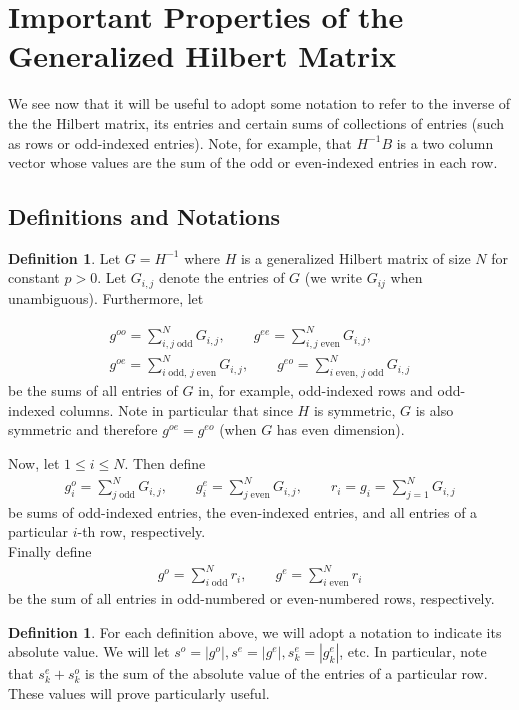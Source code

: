\documentclass{article}
\theoremstyle{definition}
\newtheorem{defn}[thm]{Definition}
\theoremstyle{remark}
\numberwithin{equation}{section}
\begin{document}
\section{Important Properties of the Generalized Hilbert Matrix}
\label{hilbert-matrices}
We see now that it will be useful to adopt some notation to refer to the inverse of the the Hilbert matrix, its entries and certain sums of collections of entries (such as rows or odd-indexed entries). Note, for example, that $H^{-1}B$ is a two column vector whose values are the sum of the odd or even-indexed entries in each row. 
\subsection{Definitions and Notations}
\begin{defn}
Let $G=H^{-1}$ where $H$ is a generalized Hilbert matrix of size $N$ for constant $p > 0$. Let $G_{i,j}$ denote the entries of $G$ (we write $G_{ij}$ when unambiguous). Furthermore, let 

\begin{align*} 
g^{oo} = \sum_{i,j \; \text{odd}}^N G_{i,j}, \qquad
g^{ee} = \sum_{i,j \; \text{even}}^N  G_{i,j}, \\
g^{oe} = \sum_{i \; \text{odd, } j \; \text{even}}^N  G_{i,j} ,\qquad
g^{eo} = \sum_{i \; \text{even, } j \; \text{odd}}^N  G_{i,j} 
\end{align*} be the sums of all entries of $G$ in, for example, odd-indexed rows and odd-indexed columns. Note in particular that since $H$ is symmetric, $G$ is also symmetric and therefore $g^{oe} = g^{eo}$ (when $G$ has even dimension). 

Now, let $1 \le i \le N$. Then define 
\begin{align*}
g_i^o= \sum_{j \; \text{odd}}^N G_{i, j} ,\qquad
g_i^e= \sum_{j \; \text{even}}^N G_{i, j} ,\qquad
r_i=g_i = \sum_{j=1}^N G_{i,j}
\end{align*} be sums of odd-indexed entries, the even-indexed entries, and all entries of a particular $i$-th row, respectively.\\
Finally define 
\begin{align*}
g^o = \sum_{i \; \text{odd}}^N r_i, \qquad 
g^e = \sum_{i \; \text{even}}^N r_i
\end{align*} be the sum of all entries in odd-numbered or even-numbered rows, respectively.
\end{defn} 
\begin{defn}\label{absolute-value-sum-of-entries}
For each definition above, we will adopt a notation to indicate its absolute value. We will let $s^o = |g^o|, s^e = |g^e|, s^e_k = |g^e_k|$, etc. In particular, note that $s_k^e + s_k^o$ is the sum of the absolute value of the entries of a particular row. These values will prove particularly useful.
\end{defn}
\end{document}
